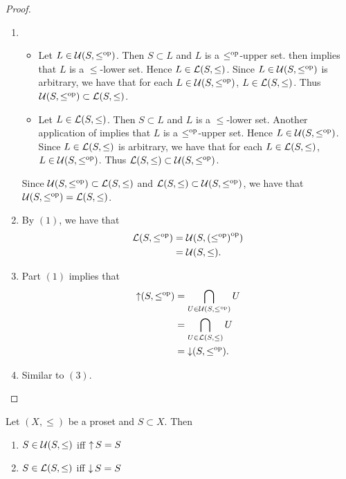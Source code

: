 \documentclass{book}
\begin{document}
	\begin{proof}\
		\begin{enumerate}
			\item 
			\begin{itemize}
				\item Let $L \in \mathcal{U}(S, \leq^{\text{op}})$. Then $S \subset L$ and $L$ is a $\leq^{\text{op}}$-upper set.  then implies that $L$ is a $\leq$-lower set. Hence $L \in \mathcal{L}(S, \leq)$. Since $L \in \mathcal{U}(S, \leq^{\text{op}})$ is arbitrary, we have that for each $L \in \mathcal{U}(S, \leq^{\text{op}})$, $L \in \mathcal{L}(S, \leq)$. Thus $\mathcal{U}(S, \leq^{\text{op}}) \subset \mathcal{L}(S, \leq)$.
				\item Let $L \in \mathcal{L}(S, \leq)$. Then $S \subset L$ and $L$ is a $\leq$-lower set. Another application of \rex{ex:orderings:prosets:0010} implies that $L$ is a $\leq^{\text{op}}$-upper set. Hence $L \in \mathcal{U}(S, \leq^{\text{op}})$. Since $L \in \mathcal{L}(S, \leq)$ is arbitrary, we have that for each $L \in \mathcal{L}(S, \leq)$, $L \in \mathcal{U}(S, \leq^{\text{op}})$. Thus $\mathcal{L}(S, \leq) \subset \mathcal{U}(S, \leq^{\text{op}})$.
			\end{itemize}
			Since $\mathcal{U}(S, \leq^{\text{op}}) \subset \mathcal{L}(S, \leq)$ and $\mathcal{L}(S, \leq) \subset \mathcal{U}(S, \leq^{\text{op}})$, we have that $\mathcal{U}(S, \leq^{\text{op}}) = \mathcal{L}(S, \leq)$.
			\item By $(1)$, we have that 
			\begin{align*}
				\mathcal{L}(S, \leq^{\text{op}})
				& = \mathcal{U}(S, {(\leq^{\text{op}})}^{\text{op}}) \\ 
				& = \mathcal{U}(S, \leq).
			\end{align*}
			\item Part $(1)$ implies that
			\begin{align*}
				\operatorname{\uparrow} (S, \leq^{\text{op}})
				& = \bigcap\limits_{U \in \mathcal{U}(S, \leq^{\text{op}})} U \\
				& = \bigcap\limits_{U \in \mathcal{L}(S, \leq)} U \\
				& = \operatorname{\downarrow} (S, \leq^{\text{op}}).
			\end{align*}
			\item Similar to $(3)$.
		\end{enumerate}
	\end{proof}
	
	\begin{ex} 
		Let $(X, \leq)$ be a proset and $S \subset X$. Then
		\begin{enumerate}
			\item $S \in \mathcal{U}(S, \leq)$ iff $\operatorname{\uparrow} S = S$ 
			\item $S \in \mathcal{L}(S, \leq)$ iff $\operatorname{\downarrow} S = S$
		\end{enumerate}
	\end{ex}
	
\end{document}
